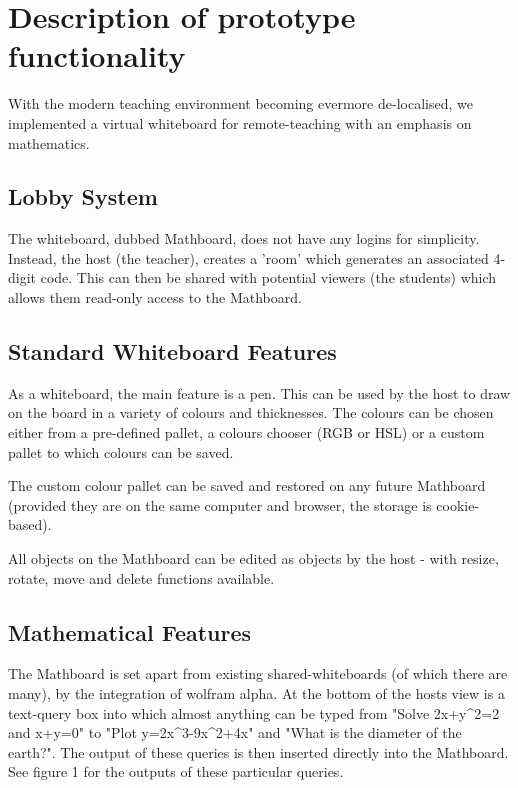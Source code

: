 \chapter{Description of prototype functionality}\label{ch:descOfFunctionality}\vspace{-10mm}

With the modern teaching environment becoming evermore de-localised, we implemented a virtual whiteboard for remote-teaching with an emphasis on  mathematics.

\section{Lobby System}
The whiteboard, dubbed Mathboard, does not have any logins for simplicity. Instead, the host (the teacher), creates a 'room' which generates an associated 4-digit code. This can then be shared with potential viewers (the students) which allows them read-only access to the Mathboard.

\section{Standard Whiteboard Features}
As a whiteboard, the main feature is a pen. This can be used by the host to draw on the board in a variety of colours and thicknesses. The colours can be chosen either from a pre-defined pallet, a colours chooser (RGB or HSL) or a custom pallet to which colours can be saved.

The custom colour pallet can be saved and restored on any future Mathboard (provided they are on the same computer and browser, the storage is cookie-based).

All objects on the Mathboard can be edited as objects by the host - with resize, rotate, move and delete functions available.

\section{Mathematical Features}
The Mathboard is set apart from existing shared-whiteboards (of which there are many), by the integration of wolfram alpha. At the bottom of the hosts view is a text-query box into which almost anything can be typed from "Solve 2x+y\textasciicircum2=2 and x+y=0" to "Plot y=2x\textasciicircum3-9x\textasciicircum2+4x" and "What is the diameter of the earth?". The output of these queries is then inserted directly into the Mathboard. See figure 1 for the outputs of these particular queries.

